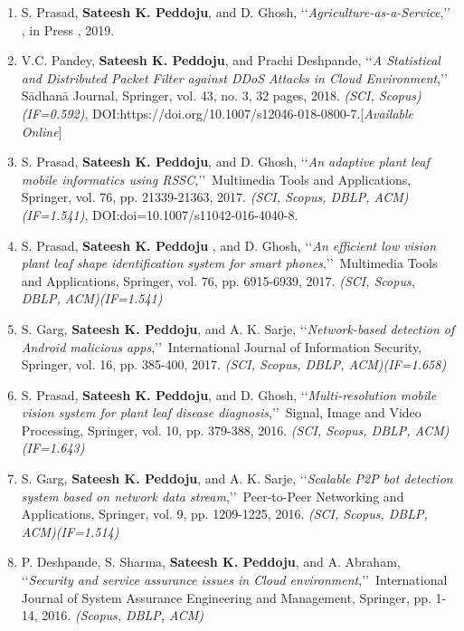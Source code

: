 \begin{enumerate}%
	\item
	S. Prasad, \textbf{Sateesh K. Peddoju}, and D. Ghosh, \lq\lq \textit{Agriculture-as-a-Service},\rq\rq\, {, in Press }, 2019. 
	
	\item
	V.C. Pandey, \textbf{Sateesh K. Peddoju}, and Prachi Deshpande, \lq\lq \textit{A Statistical and Distributed Packet Filter against DDoS Attacks in Cloud Environment},\rq\rq\, S{\={a}}dhan{\={a}} Journal, Springer, vol. 43, no. 3, 32 pages, 2018. \emph{(SCI, Scopus)(IF=0.592)}, DOI:https://doi.org/10.1007/s12046-018-0800-7.[\textit{Available Online}]
	
	\item
	S. Prasad, \textbf{Sateesh K. Peddoju}, and D. Ghosh, \lq\lq \textit{An adaptive plant leaf mobile informatics using RSSC},\rq\rq\, Multimedia Tools and Applications, Springer, vol. 76, pp. 21339-21363, 2017. \emph{(SCI, Scopus, DBLP, ACM)(IF=1.541)}, DOI:doi=10.1007/s11042-016-4040-8.
	
	\item
	S. Prasad, \textbf{Sateesh K. Peddoju} , and D. Ghosh, \lq\lq \textit{An efficient low vision plant leaf shape identification system for smart phones},\rq\rq\, Multimedia Tools and Applications, Springer, vol. 76, pp. 6915-6939, 2017. \emph{(SCI, Scopus, DBLP, ACM)(IF=1.541)}
	
	\item
	S. Garg, \textbf{Sateesh K. Peddoju}, and A. K. Sarje, \lq\lq \textit{Network-based detection of Android malicious apps},\rq\rq\, International Journal of Information Security, Springer, vol. 16, pp. 385-400, 2017. \emph{(SCI, Scopus, DBLP, ACM)(IF=1.658)}
	
	\item
	S. Prasad, \textbf{Sateesh K. Peddoju}, and D. Ghosh, \lq\lq \textit{Multi-resolution mobile vision system for plant leaf disease diagnosis},\rq\rq\, Signal, Image and Video Processing, Springer, vol. 10, pp. 379-388, 2016. \emph{(SCI, Scopus, DBLP, ACM)(IF=1.643)}
	
	\item
	S. Garg, \textbf{Sateesh K. Peddoju}, and A. K. Sarje, \lq\lq \textit{Scalable P2P bot detection system based on network data stream},\rq\rq\, Peer-to-Peer Networking and Applications, Springer, vol. 9, pp. 1209-1225, 2016. \emph{(SCI, Scopus, DBLP, ACM)(IF=1.514)}
	
	\item
	P. Deshpande, S. Sharma, \textbf{Sateesh K. Peddoju}, and A. Abraham, \lq\lq \textit{Security and service assurance issues in Cloud environment},\rq\rq\, International Journal of System Assurance Engineering and Management, Springer, pp. 1-14, 2016. \emph{(Scopus, DBLP, ACM)}
	

\end{enumerate}
